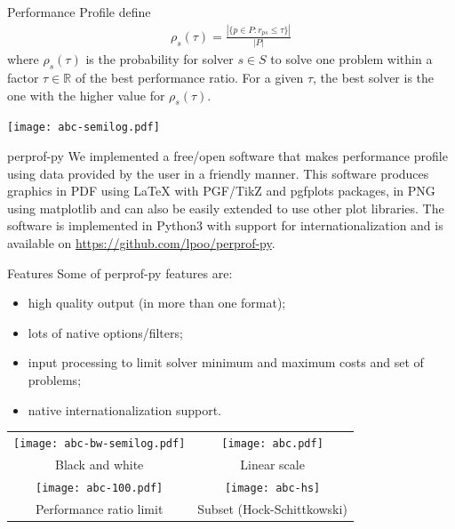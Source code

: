 \documentclass[a0paper,portrait]{baposter}
\begin{document}
\begin{poster}
\begin{posterbox}[column=0,below=auto]{Performance Profile}
    \textcite{Dolan2002} define
    \begin{align*}
      \rho_s(\tau) = \frac{| \{p \in P: r_{ps} \leq \tau\} |}{| P |}
    \end{align*}
    where $\rho_s(\tau)$ is the probability for solver $s \in S$ to solve one
    problem within a factor $\tau \in \mathbb{R}$ of the best performance
    ratio. For a given $\tau$, the best solver is the one with the higher
    value for $\rho_s(\tau)$.

    \texttt{[image: abc-semilog.pdf]}
  \end{posterbox}

  \begin{posterbox}[column=0,below=auto,name=perprof]{perprof-py}
    We implemented a free/open software that makes performance profile using data
    provided by the user in a friendly manner. This software produces graphics in PDF
    using LaTeX with PGF/TikZ and pgfplots packages,
    in PNG using matplotlib and can also be easily extended to
    use other plot libraries. The software is implemented in Python3 with
    support for internationalization and is available on
    \url{https://github.com/lpoo/perprof-py}.
  \end{posterbox}

  \begin{posterbox}[column=1]{Features}
    Some of perprof-py features are:
    \begin{itemize}[noitemsep]
      \item high quality output (in more than one format);
      \item lots of native options/filters;
      \item input processing to limit solver minimum and maximum costs and set
        of problems;
      \item native internationalization support.
    \end{itemize}

    \begin{center}
      \begin{tabular}{cc}
        \texttt{[image: abc-bw-semilog.pdf]} &
        \texttt{[image: abc.pdf]} \\
        Black and white & Linear scale \\
        \texttt{[image: abc-100.pdf]} &
        \texttt{[image: abc-hs]} \\
        Performance ratio limit & Subset (Hock-Schittkowski)
      \end{tabular}
    \end{center}


\end{posterbox}
\end{poster}
\end{document}
